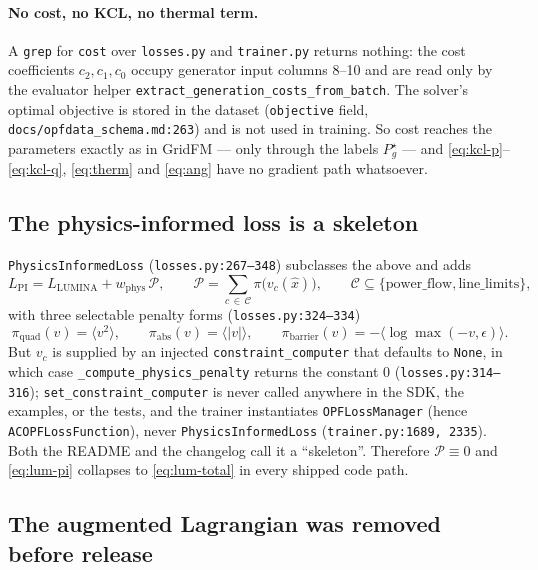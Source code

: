 \documentclass[11pt]{article}
\newcommand{\pred}[1]{\widehat{#1}}
\newcommand{\code}[1]{\texttt{\small #1}}
\begin{document}
\paragraph{No cost, no KCL, no thermal term.} A \code{grep} for \code{cost} over
\code{losses.py} and \code{trainer.py} returns nothing: the cost coefficients
$c_2,c_1,c_0$ occupy generator input columns 8--10 and are read only by the evaluator
helper \code{extract\_generation\_costs\_from\_batch}. The solver's optimal objective is
stored in the dataset (\code{objective} field, \code{docs/opfdata\_schema.md:263}) and is
not used in training. So cost reaches the parameters exactly as in GridFM --- only through
the labels $P^\star_g$ --- and \eqref{eq:kcl-p}--\eqref{eq:kcl-q}, \eqref{eq:therm} and
\eqref{eq:ang} have no gradient path whatsoever.

\subsection{The physics-informed loss is a skeleton}

\code{PhysicsInformedLoss} (\code{losses.py:267--348}) subclasses the above and adds
\begin{equation}
L_{\mathrm{PI}} = L_{\mathrm{LUMINA}} + w_{\mathrm{phys}}\,\mathcal{P},
\qquad
\mathcal{P}=\sum_{c\,\in\,\mathcal{C}} \pi\big(v_c(\pred{x})\big),
\qquad
\mathcal{C}\subseteq\{\text{power\_flow},\text{line\_limits}\},
\label{eq:lum-pi}
\end{equation}
with three selectable penalty forms (\code{losses.py:324--334})
\begin{equation}
\pi_{\mathrm{quad}}(v)=\big\langle v^2\big\rangle,
\qquad
\pi_{\mathrm{abs}}(v)=\big\langle |v|\big\rangle,
\qquad
\pi_{\mathrm{barrier}}(v)=-\big\langle \log\max(-v,\epsilon)\big\rangle .
\label{eq:lum-penalty}
\end{equation}
But $v_c$ is supplied by an injected \code{constraint\_computer} that defaults to
\code{None}, in which case \code{\_compute\_physics\_penalty} returns the constant $0$
(\code{losses.py:314--316}); \code{set\_constraint\_computer} is never called anywhere in
the SDK, the examples, or the tests, and the trainer instantiates \code{OPFLossManager}
(hence \code{ACOPFLossFunction}), never \code{PhysicsInformedLoss}
(\code{trainer.py:1689, 2335}). Both the README and the changelog call it a ``skeleton''.
Therefore $\mathcal{P}\equiv 0$ and \eqref{eq:lum-pi} collapses to \eqref{eq:lum-total} in
every shipped code path.

\subsection{The augmented Lagrangian was removed before release}
\end{document}
